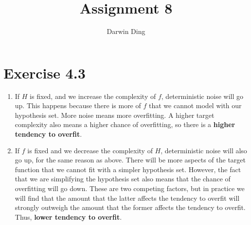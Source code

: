 \documentclass[12pt]{article}
\begin{document}
\title{Assignment 8}
\author{Darwin Ding}
\maketitle

\section*{Exercise 4.3}
\begin{enumerate}[label=(\alph*)]
	\item If $H$ is fixed, and we increase the complexity of $f$, deterministic noise will go up. This happens because there is more of $f$ that we cannot model with our hypothesis set. More noise means more overfitting. A higher target complexity also means a higher chance of overfitting, so there is a \textbf{higher tendency to overfit}.
	\item If $f$ is fixed and we decrease the complexity of $H$, deterministic noise will also go up, for the same reason as above. There will be more aspects of the target function that we cannot fit with a simpler hypothesis set. However, the fact that we are simplifying the hypothesis set also means that the chance of overfitting will go down. These are two competing factors, but in practice we will find that the amount that the latter affects the tendency to overfit will strongly outweigh the amount that the former affects the tendency to overfit. Thus, \textbf{lower tendency to overfit}.
\end{enumerate}
\end{document}
